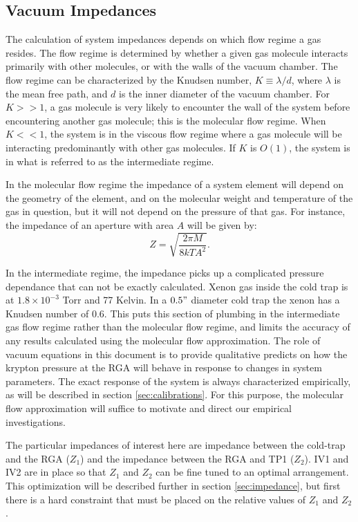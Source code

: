 \documentclass[12pt]{article}
\begin{document}
\subsection{Vacuum Impedances}
The calculation of system impedances depends on which flow regime a gas resides. The flow regime is determined by whether a given gas molecule interacts primarily with other molecules, or with the walls of the vacuum chamber. The flow regime can be characterized by the Knudsen number, $K \equiv \lambda/d$, where $\lambda$ is the mean free path, and $d$ is the inner diameter of the vacuum chamber. For $K>>1$, a gas molecule is very likely to encounter the wall of the system before encountering another gas molecule; this is the molecular flow regime. When $K<<1$, the system is in the viscous flow regime where a gas molecule will be interacting predominantly with other gas molecules. If $K$ is $O(1)$, the system is in what is referred to as the intermediate regime.\cite{vac_eq}

In the molecular flow regime the impedance of a system element will depend on the geometry of the element, and on the molecular weight and temperature of the gas in question, but it will not depend on the pressure of that gas. For instance, the impedance of an aperture with area $A$ will be given by:\cite{vac_eq}
\begin{equation}
\label{eq:aperture}
Z=\sqrt{\frac{2\pi M}{8kTA^{2}}}.
\end{equation}

In the intermediate regime, the impedance picks up a complicated pressure dependance that can not be exactly calculated. Xenon gas inside the cold trap is at $1.8\times 10^{-3}$ Torr and 77 Kelvin.\cite{vaporpressure} In a $0.5"$ diameter cold trap the xenon has a Knudsen number of 0.6. This puts this section of plumbing in the intermediate gas flow regime rather than the molecular flow regime, and limits the accuracy of any results calculated using the molecular flow approximation. The role of vacuum equations in this document is to provide qualitative predicts on how the krypton pressure at the RGA will behave in response to changes in system parameters. The exact response of the system is always characterized empirically, as will be described in section \ref{sec:calibrations}. For this purpose, the molecular flow approximation will suffice to motivate and direct our empirical investigations.\cite{vac_eq}

The particular impedances of interest here are impedance between the cold-trap and the RGA ($Z_1$) and the impedance between the RGA and TP1 ($Z_2$). IV1 and IV2 are in place so that $Z_1$ and $Z_2$ can be fine tuned to an optimal arrangement. This optimization will be described further in section \ref{sec:impedance}, but first there is a hard constraint that must be placed on the relative values of $Z_1$ and $Z_2$.
\end{document}
